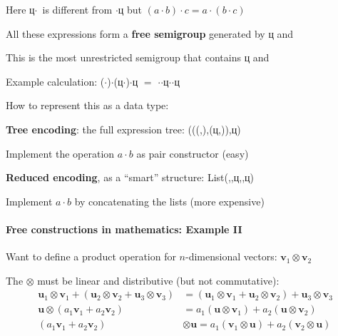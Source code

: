 Here \foreignlanguage{russian}{ц}$\cdot$\shui~is different from
\shui$\cdot$\foreignlanguage{russian}{ц} but $\left(a\cdot b\right)\cdot c=a\cdot\left(b\cdot c\right)$

All these expressions form a \textbf{free semigroup} generated by
\foreignlanguage{russian}{ц} and \shui

This is the most unrestricted semigroup that contains \foreignlanguage{russian}{ц}
and \shui

Example calculation: (\shui$\cdot$\shui)$\cdot$(\foreignlanguage{russian}{ц}$\cdot$\shui)$\cdot$\foreignlanguage{russian}{ц}
$=$ \shui$\cdot$\shui$\cdot$\foreignlanguage{russian}{ц}$\cdot$\shui$\cdot$\foreignlanguage{russian}{ц}

How to represent this as a data type:

\textbf{Tree encoding}: the full expression tree: (((\shui,\shui),(\foreignlanguage{russian}{ц},\shui)),\foreignlanguage{russian}{ц})

Implement the operation $a\cdot b$ as pair constructor (easy)

\textbf{Reduced encoding}, as a \textsf{``}smart\textsf{''} structure: List(\shui,\shui,\foreignlanguage{russian}{ц},\shui,\foreignlanguage{russian}{ц})

Implement $a\cdot b$ by concatenating the lists (more expensive)


\paragraph{Free constructions in mathematics: Example II}

Want to define a product operation for $n$-dimensional vectors: $\mathbf{v}_{1}\otimes\mathbf{v}_{2}$

The $\otimes$ must be linear and distributive (but not commutative):
\begin{align*}
\mathbf{u}_{1}\otimes\mathbf{v}_{1}+\left(\mathbf{u}_{2}\otimes\mathbf{v}_{2}+\mathbf{u}_{3}\otimes\mathbf{v}_{3}\right) & =\left(\mathbf{u}_{1}\otimes\mathbf{v}_{1}+\mathbf{u}_{2}\otimes\mathbf{v}_{2}\right)+\mathbf{u}_{3}\otimes\mathbf{v}_{3}\\
\mathbf{u}\otimes\left(a_{1}\mathbf{v}_{1}+a_{2}\mathbf{v}_{2}\right) & =a_{1}\left(\mathbf{u}\otimes\mathbf{v}_{1}\right)+a_{2}\left(\mathbf{u}\otimes\mathbf{v}_{2}\right)\\
\left(a_{1}\mathbf{v}_{1}+a_{2}\mathbf{v}_{2}\right) & \otimes\mathbf{u}=a_{1}\left(\mathbf{v}_{1}\otimes\mathbf{u}\right)+a_{2}\left(\mathbf{v}_{2}\otimes\mathbf{u}\right)
\end{align*}

